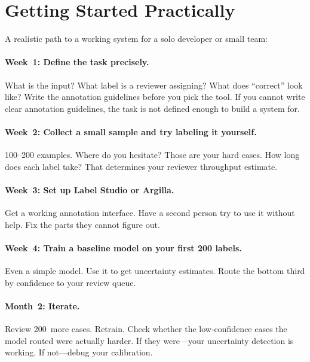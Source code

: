\section{Getting Started Practically}
\label{sec:ch09-getting-started}

A realistic path to a working \hitl system for a solo developer or small team:

\paragraph{Week~1: Define the task precisely.} What is the input? What label is a reviewer assigning? What does ``correct'' look like? Write the annotation guidelines before you pick the tool. If you cannot write clear annotation guidelines, the task is not defined enough to build a system for.

\paragraph{Week~2: Collect a small sample and try labeling it yourself.} 100--200 examples. Where do you hesitate? Those are your hard cases. How long does each label take? That determines your reviewer throughput estimate.

\paragraph{Week~3: Set up Label Studio or Argilla.} Get a working annotation interface. Have a second person try to use it without help. Fix the parts they cannot figure out.

\paragraph{Week~4: Train a baseline model on your first 200 labels.} Even a simple model. Use it to get uncertainty estimates. Route the bottom third by confidence to your review queue.

\paragraph{Month~2: Iterate.} Review 200~more cases. Retrain. Check whether the low-confidence cases the model routed were actually harder. If they were---your uncertainty detection is working. If not---debug your calibration.

